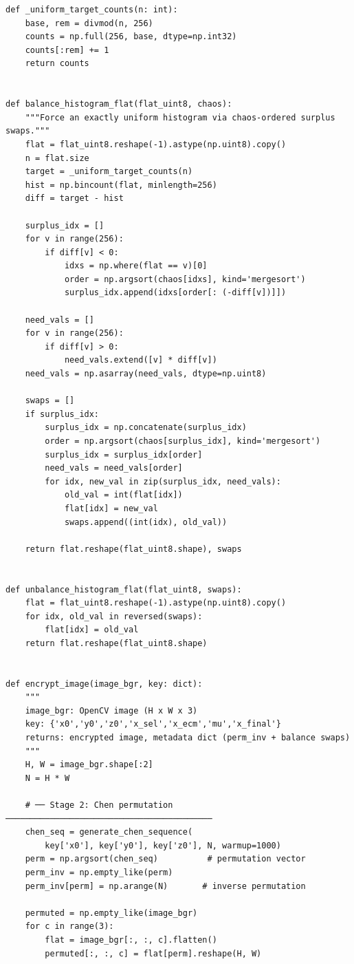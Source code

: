 \begin{verbatim}
def _uniform_target_counts(n: int):
    base, rem = divmod(n, 256)
    counts = np.full(256, base, dtype=np.int32)
    counts[:rem] += 1
    return counts


def balance_histogram_flat(flat_uint8, chaos):
    """Force an exactly uniform histogram via chaos-ordered surplus swaps."""
    flat = flat_uint8.reshape(-1).astype(np.uint8).copy()
    n = flat.size
    target = _uniform_target_counts(n)
    hist = np.bincount(flat, minlength=256)
    diff = target - hist

    surplus_idx = []
    for v in range(256):
        if diff[v] < 0:
            idxs = np.where(flat == v)[0]
            order = np.argsort(chaos[idxs], kind='mergesort')
            surplus_idx.append(idxs[order[: (-diff[v])]])

    need_vals = []
    for v in range(256):
        if diff[v] > 0:
            need_vals.extend([v] * diff[v])
    need_vals = np.asarray(need_vals, dtype=np.uint8)

    swaps = []
    if surplus_idx:
        surplus_idx = np.concatenate(surplus_idx)
        order = np.argsort(chaos[surplus_idx], kind='mergesort')
        surplus_idx = surplus_idx[order]
        need_vals = need_vals[order]
        for idx, new_val in zip(surplus_idx, need_vals):
            old_val = int(flat[idx])
            flat[idx] = new_val
            swaps.append((int(idx), old_val))

    return flat.reshape(flat_uint8.shape), swaps


def unbalance_histogram_flat(flat_uint8, swaps):
    flat = flat_uint8.reshape(-1).astype(np.uint8).copy()
    for idx, old_val in reversed(swaps):
        flat[idx] = old_val
    return flat.reshape(flat_uint8.shape)


def encrypt_image(image_bgr, key: dict):
    """
    image_bgr: OpenCV image (H x W x 3)
    key: {'x0','y0','z0','x_sel','x_ecm','mu','x_final'}
    returns: encrypted image, metadata dict (perm_inv + balance swaps)
    """
    H, W = image_bgr.shape[:2]
    N = H * W

    # ── Stage 2: Chen permutation ──────────────────────────────────────────
    chen_seq = generate_chen_sequence(
        key['x0'], key['y0'], key['z0'], N, warmup=1000)
    perm = np.argsort(chen_seq)          # permutation vector
    perm_inv = np.empty_like(perm)
    perm_inv[perm] = np.arange(N)       # inverse permutation

    permuted = np.empty_like(image_bgr)
    for c in range(3):
        flat = image_bgr[:, :, c].flatten()
        permuted[:, :, c] = flat[perm].reshape(H, W)


\end{verbatim}
